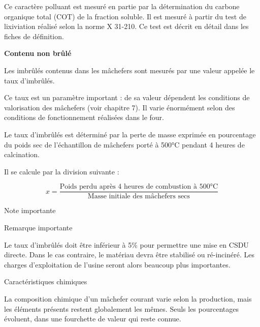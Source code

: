 Ce caractère polluant est mesuré en partie par la détermination du carbone organique total (COT) de la fraction soluble. Il est mesuré à partir du test de lixiviation réalisé selon la norme X 31-210. Ce test est décrit en détail dans les fiches de définition.

\vspace{0.3cm}
\textbf{Contenu non brûlé}
\vspace{0.3cm}

Les imbrûlés contenus dans les mâchefers sont mesurés par une valeur appelée le taux d’imbrûlés. 
\vspace{0.3cm}

Ce taux est un paramètre important : de sa valeur dépendent les conditions de valorisation des mâchefers (voir chapitre 7). Il varie énormément selon des conditions de fonctionnement réalisées dans le four.
\vspace{0.3cm}

Le taux d’imbrûlés est déterminé par la perte de masse exprimée en pourcentage du poids sec de l’échantillon de mâchefers porté à 500°C pendant 4 heures de calcination.
\vspace{0.3cm}

Il se calcule par la division suivante :
 

 
 \[
 x = \frac{\text{Poids perdu après 4 heures de combustion à 500°C}}{\text{Masse initiale des mâchefers secs}}
\]
 
\vspace{0.3cm}
Note importante
\vspace{0.3cm} 

\vspace{0.3cm}
Remarque importante
\vspace{0.3cm}

Le taux d’imbrûlés doit être inférieur à 5\% pour permettre une mise en CSDU directe. Dans le cas contraire, le matériau devra être stabilisé ou ré-incinéré.  Les charges d’exploitation de l’usine seront alors beaucoup plus importantes.


\vspace{0.3cm}
Caractéristiques chimiques
\vspace{0.3cm}

La composition chimique d’un mâchefer courant varie selon la production, mais les éléments présents restent globalement les mêmes. Seuls les pourcentages évoluent, dans une fourchette de valeur qui reste connue. 

\vspace{0.3cm}

